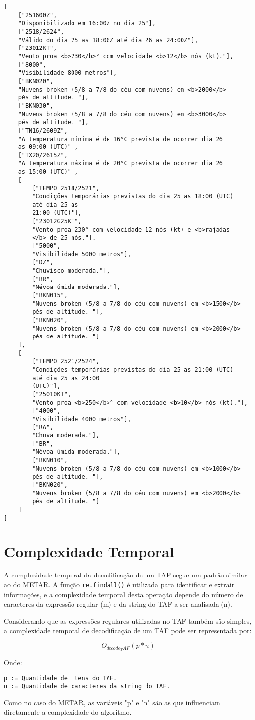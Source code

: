 \begin{verbatim}
[
    ["251600Z",
    "Disponibilizado em 16:00Z no dia 25"],
    ["2518/2624",
    "Válido do dia 25 as 18:00Z até dia 26 as 24:00Z"],
    ["23012KT",
    "Vento proa <b>230</b>° com velocidade <b>12</b> nós (kt)."],
    ["8000",
    "Visibilidade 8000 metros"],
    ["BKN020",
    "Nuvens broken (5/8 a 7/8 do céu com nuvens) em <b>2000</b> 
    pés de altitude. "],
    ["BKN030",
    "Nuvens broken (5/8 a 7/8 do céu com nuvens) em <b>3000</b> 
    pés de altitude. "],
    ["TN16/2609Z",
    "A temperatura mínima é de 16°C prevista de ocorrer dia 26 
    as 09:00 (UTC)"],
    ["TX20/2615Z",
    "A temperatura máxima é de 20°C prevista de ocorrer dia 26 
    as 15:00 (UTC)"],
    [
        ["TEMPO 2518/2521",
        "Condições temporárias previstas do dia 25 as 18:00 (UTC) 
        até dia 25 as 
        21:00 (UTC)"],
        ["23012G25KT",
        "Vento proa 230° com velocidade 12 nós (kt) e <b>rajadas
        </b> de 25 nós."],
        ["5000",
        "Visibilidade 5000 metros"],
        ["DZ",
        "Chuvisco moderada."],
        ["BR",
        "Névoa úmida moderada."],
        ["BKN015",
        "Nuvens broken (5/8 a 7/8 do céu com nuvens) em <b>1500</b> 
        pés de altitude. "],
        ["BKN020",
        "Nuvens broken (5/8 a 7/8 do céu com nuvens) em <b>2000</b> 
        pés de altitude. "]
    ],
    [
        ["TEMPO 2521/2524",
        "Condições temporárias previstas do dia 25 as 21:00 (UTC) 
        até dia 25 as 24:00 
        (UTC)"],
        ["25010KT",
        "Vento proa <b>250</b>° com velocidade <b>10</b> nós (kt)."],
        ["4000",
        "Visibilidade 4000 metros"],
        ["RA",
        "Chuva moderada."],
        ["BR",
        "Névoa úmida moderada."],
        ["BKN010",
        "Nuvens broken (5/8 a 7/8 do céu com nuvens) em <b>1000</b> 
        pés de altitude. "],
        ["BKN020",
        "Nuvens broken (5/8 a 7/8 do céu com nuvens) em <b>2000</b> 
        pés de altitude. "]
    ]
]
\end{verbatim}

\section{Complexidade Temporal}

A complexidade temporal da decodificação de um TAF segue um padrão similar ao do METAR.
A função \texttt{re.findall()} é utilizada para identificar e extrair informações, e a
complexidade temporal desta operação depende do número de caracteres da expressão regular
(m) e da string do TAF a ser analisada (n).

Considerando que as expressões regulares utilizadas no TAF também são simples, a complexidade
temporal de decodificação de um TAF pode ser representada por:

$$ O_{decode_TAF}(p * n)$$

Onde:

\begin{verbatim}
p := Quantidade de itens do TAF.
n := Quantidade de caracteres da string do TAF.
\end{verbatim}

Como no caso do METAR, as variáveis "p" e "n" são as que influenciam diretamente a
complexidade do algoritmo.